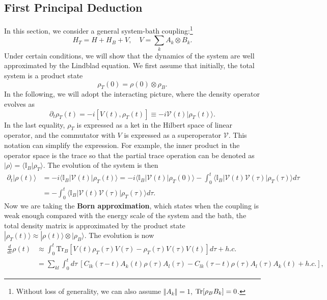 \documentclass{SciPost}
\begin{document}
\subsection{First Principal Deduction}
In this section, we consider a general system-bath coupling:\footnote{Without loss of generality, we can also assume $\Vert A_k \Vert =1$, $\operatorname{Tr}[\rho_B B_k]=0$.}
\begin{equation}
	H_T = H + H_B + V, \quad V = \sum_k A_k \otimes B_k.
\end{equation}
Under certain conditions, we will show that the dynamics of the system are well approximated by the Lindblad equation. We first assume that initially, the total system is a product state 
$$\rho_T(0) = \rho(0) \otimes \rho_B.$$ 
In the following, we will adopt the interacting picture, where the density operator evolves as 
$$\partial_t \rho_T(t) = -i[V(t), \rho_T(t)] \equiv -i\mathcal V(t) |\rho_T(t) \rangle.$$
In the last equality, $\rho_T$ is expressed as a ket in the Hilbert space of linear operator, and the commutator with $V$ is expressed as a superoperator $\mathcal V$. This notation can simplify the expression. For example, the inner product in the operator space is the trace so that the partial trace operation can be denoted as $|\rho\rangle = \langle \mathbb I_B|\rho_T\rangle$. The evolution of the system is then 
\begin{equation}
\begin{aligned}
	\partial_t |\rho(t)\rangle &= -i \langle \mathbb I_B|\mathcal V(t) |\rho_T(t)\rangle 
	= -i \langle \mathbb I_B|\mathcal{V}(t) |\rho_T(0)\rangle - \int_0^t \langle \mathbb I_B| \mathcal{V}(t) \mathcal{V}(\tau) |\rho_T(\tau)\rangle d\tau \\
	&= - \int_0^t \langle \mathbb I_B| \mathcal{V}(t) \mathcal{V}(\tau) |\rho_T(\tau)\rangle d\tau.
\end{aligned}
\end{equation}
Now we are taking the \textbf{Born approximation}, which states when the coupling is weak enough compared with the energy scale of the system and the bath, the total density matrix is approximated by the product state $|\rho_T(t)\rangle \approx |\rho(t)\rangle \otimes |\rho_B\rangle$. The evolution is now
\begin{equation}
\begin{aligned}
	\frac{d}{dt} \rho(t) 
	&\approx  \int_0^t \mathrm{Tr}_B\left[ V(t) \rho_T(\tau) V(\tau)- \rho_T(\tau) V(\tau) V(t) \right]d\tau +h.c. \\
	&= \sum_{kl}\int_0^t d\tau\ \left[C_{lk}(\tau - t) A_k(t)\rho(\tau)A_l(\tau) -  C_{lk}(\tau - t)\rho(\tau)A_l(\tau)A_k(t)+h.c.\right],
\end{aligned}
\end{equation}
\end{document}
